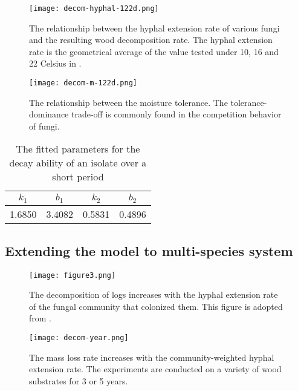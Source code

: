 \begin{figure}
    \centering
    \begin{minipage}[t]{0.48\textwidth}
        \centering
        \texttt{[image: decom-hyphal-122d.png]}
        \caption{The relationship between the hyphal extension rate of various fungi and the resulting wood decomposition rate. The hyphal extension rate is the geometrical average of the value tested under 10, 16 and 22 Celsius in \cite{Lustenshouwer}.}
        \label{fig:decom-hyphal-122d}
    \end{minipage}
    \begin{minipage}[t]{0.48\textwidth}
        \centering
        \texttt{[image: decom-m-122d.png]}
        \caption{The  relationship  between  the  moisture tolerance. The tolerance-dominance trade-off is commonly found in the competition behavior of fungi. \cite{Maynard-data}}
        \label{fig:decom-m-122d}
    \end{minipage}
\end{figure}

\begin{table}
    \begin{minipage}{0.5\textwidth}
        \caption{The fitted parameters for the decay ability of an isolate over a short period}
        \label{tb:para-122d}
    \end{minipage}
    \begin{minipage}{0.5\textwidth}\centering
        \begin{tabular}{cccc}
            \toprule
            $k_1$  & $b_1$  & $k_2$  & $b_2$  \\
            \midrule
            1.6850 & 3.4082 & 0.5831 & 0.4896 \\
            \bottomrule
        \end{tabular}
    \end{minipage}
\end{table}


\subsection{Extending the model to multi-species system}

\begin{figure}
    \centering
    \begin{minipage}[t]{0.48\textwidth}
        \centering
        \texttt{[image: figure3.png]}
        \caption{The decomposition of logs increases with the hyphal extension rate of the fungal community that colonized them. This figure is adopted from \cite{Lustenshouwer}.}
        \label{fig:community}
    \end{minipage}
    \begin{minipage}[t]{0.48\textwidth}
        \centering
        \texttt{[image: decom-year.png]}
        \caption{The mass loss rate increases with the community-weighted hyphal extension rate. The experiments are conducted on a variety of wood substrates for 3 or 5 years.}
        \label{fig:decom-year}
    \end{minipage}
\end{figure}

